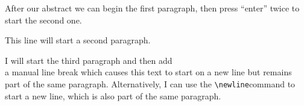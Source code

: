 \documentclass{article}
\begin{document}
\begin{abstract}
This is a simple paragraph at the beginning of the 
document. A brief introduction about the main subject.
\end{abstract}

After our abstract we can begin the first paragraph, then press ``enter'' twice to start the second one.

This line will start a second paragraph.

I will start the third paragraph and then add \\ a manual line break which causes this text to start on a new line but remains part of the same paragraph. Alternatively, I can use the \verb|\newline|\newline command to start a new line, which is also part of the same paragraph.
\end{document}
